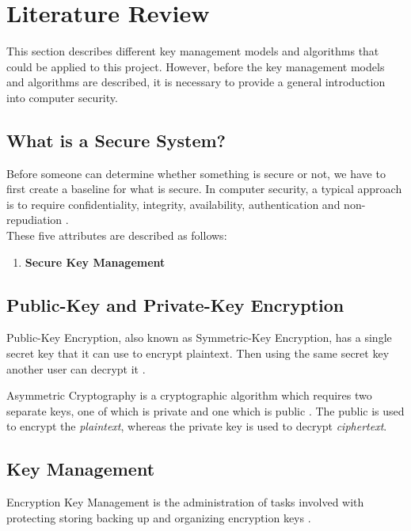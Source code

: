 \documentclass[11pt, a4paper, notitlepage]{article}
\begin{document}
\makeblankpage


\section{Literature Review}
This section describes different key management models and algorithms that could be applied to this project. However, before the key management models and algorithms are described, it is necessary to provide a general introduction into computer security. 

\subsection*{What is a Secure System?}
Before someone can determine whether something is secure or not, we have to first create a baseline for what is secure. In computer security, a typical approach is to require confidentiality, integrity, availability, authentication and non-repudiation \cite{Pfleeger:2006:SC:1177321}. \\

These five attributes are described as follows:

\begin{enumerate}
\item \textbf{Secure Key Management} \\

\end{enumerate}


\subsection*{Public-Key and Private-Key Encryption}
Public-Key Encryption, also known as Symmetric-Key Encryption, has a single secret key that it can use to encrypt plaintext. Then using the same secret key another user can decrypt it \cite{ferguson2003practical}. 



Asymmetric Cryptography is a cryptographic algorithm which requires two separate keys, one of which is private and one which is public \cite{ferguson2003practical}. The public is used to encrypt the \emph{plaintext}, whereas the private key is used to decrypt \emph{ciphertext}.





\subsection*{Key Management}
Encryption Key Management is the administration of tasks involved with protecting storing backing up and organizing encryption keys \cite{defination:key-management}. 
\end{document}
